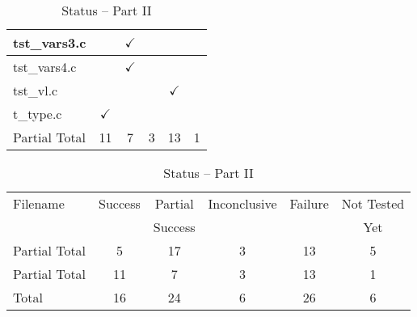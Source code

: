 \begin{table}[H]
\begin{tabular}{|l|c|c|c|c|c|}
tst\_vars3.c            &               & $\checkmark$  &               &               &               \\ \hline
tst\_vars4.c            &               & $\checkmark$  &               &               &               \\ \hline
tst\_vl.c               &               &               &               & $\checkmark$  &               \\ \hline
t\_type.c               & $\checkmark$  &               &               &               &               \\ \hline
\hline
Partial Total           &     11        &       7       &       3       &       13      &       1       \\ \hline
\end{tabular}
\caption{\label{tab:nc_test4_status_2} Status -- Part II}
\end{table}

\begin{table}[H]
\centering
\begin{tabular}{|l|c|c|c|c|c|}
\hline
Filename                & Success       & Partial       & Inconclusive  & Failure       & Not Tested    \\
                        &               & Success       &               &               & Yet           \\ \hline \hline
Partial Total           &     5         &       17      &       3       &       13      &       5       \\ \hline
Partial Total           &     11        &       7       &       3       &       13      &       1       \\ \hline \hline
Total                   &     16        &       24      &      6        &       26      &       6       \\ \hline \hline
\end{tabular}
\caption{\label{tab:nc_test4_status_2} Status -- Part II}
\end{table}
